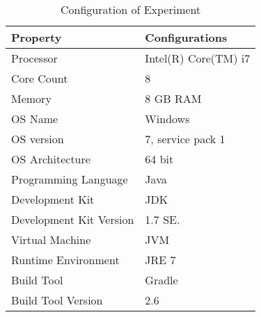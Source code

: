 %
%
\begin{table}
\centering

\begin{tabular}{|l|l|}
\hline 
	Property&Configurations\\ \hline\hline

	Processor				& Intel(R) Core(TM) i7		\\ \hline
	Core Count				& 8							\\\hline
	Memory					& 8 GB RAM 					\\\hline
	OS Name					& Windows					\\ \hline
	OS version 				& 7, service pack 1 		\\ \hline
	OS Architecture 		& 64 bit					\\ \hline
	Programming Language 	& Java						\\ \hline
	Development Kit 		& JDK						\\ \hline
	Development Kit Version & 1.7 SE.					\\\hline
	Virtual Machine 		& JVM						\\ \hline
	Runtime Environment 	& JRE 7						\\\hline
	Build Tool				& Gradle					\\\hline
	Build Tool Version		& 2.6						\\\hline
	\end{tabular}
\caption{Configuration of Experiment}
\label{table:experiment_configuration}
\end{table}
%